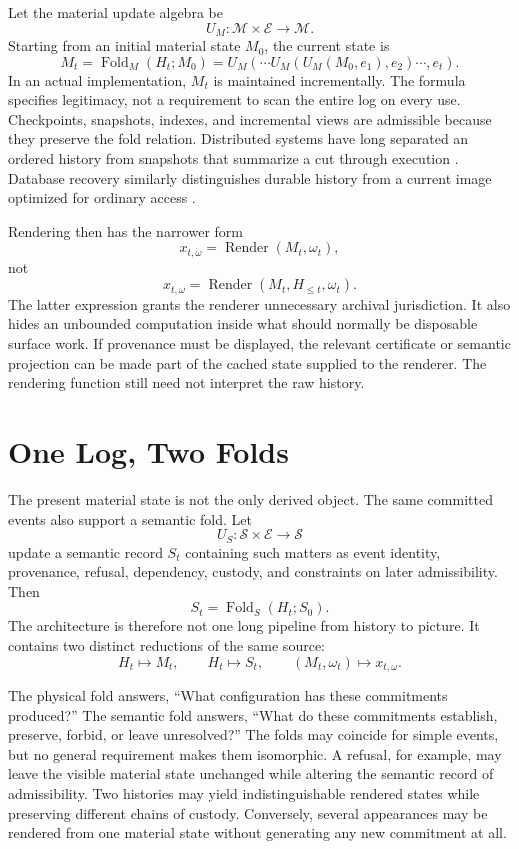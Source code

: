 \documentclass[11pt]{article}
\newcommand{\Fold}{\operatorname{Fold}}
\newcommand{\Render}{\operatorname{Render}}
\begin{document}
Let the material update algebra be
\[
U_M : \mathcal{M}\times\mathcal{E}\rightarrow\mathcal{M}.
\]
Starting from an initial material state $M_0$, the current state is
\[
M_t=\Fold_M(H_t;M_0)
=U_M(\cdots U_M(U_M(M_0,e_1),e_2)\cdots,e_t).
\]
In an actual implementation, $M_t$ is maintained incrementally. The formula specifies legitimacy, not a requirement to scan the entire log on every use. Checkpoints, snapshots, indexes, and incremental views are admissible because they preserve the fold relation. Distributed systems have long separated an ordered history from snapshots that summarize a cut through execution \cite{lamport1978,chandy1985}. Database recovery similarly distinguishes durable history from a current image optimized for ordinary access \cite{gray1993}.

Rendering then has the narrower form
\[
x_{t,\omega}=\Render(M_t,\omega_t),
\]
not
\[
x_{t,\omega}=\Render(M_t,H_{\leq t},\omega_t).
\]
The latter expression grants the renderer unnecessary archival jurisdiction. It also hides an unbounded computation inside what should normally be disposable surface work. If provenance must be displayed, the relevant certificate or semantic projection can be made part of the cached state supplied to the renderer. The rendering function still need not interpret the raw history.

\section{One Log, Two Folds}

The present material state is not the only derived object. The same committed events also support a semantic fold. Let
\[
U_S:\mathcal{S}\times\mathcal{E}\rightarrow\mathcal{S}
\]
update a semantic record $S_t$ containing such matters as event identity, provenance, refusal, dependency, custody, and constraints on later admissibility. Then
\[
S_t=\Fold_S(H_t;S_0).
\]
The architecture is therefore not one long pipeline from history to picture. It contains two distinct reductions of the same source:
\[
H_t \mapsto M_t,
\qquad
H_t \mapsto S_t,
\qquad
(M_t,\omega_t)\mapsto x_{t,\omega}.
\]

The physical fold answers, ``What configuration has these commitments produced?'' The semantic fold answers, ``What do these commitments establish, preserve, forbid, or leave unresolved?'' The folds may coincide for simple events, but no general requirement makes them isomorphic. A refusal, for example, may leave the visible material state unchanged while altering the semantic record of admissibility. Two histories may yield indistinguishable rendered states while preserving different chains of custody. Conversely, several appearances may be rendered from one material state without generating any new commitment at all.
\end{document}
